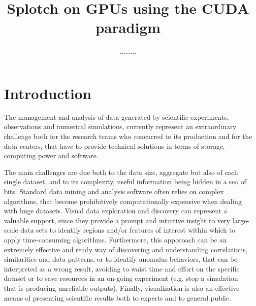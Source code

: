 \documentclass[11pt]{article}
\title{Splotch on GPUs using the CUDA paradigm}
\author{.........}
\begin{document}
\maketitle

\section{Introduction}
\label{sec:intro}

The management and analysis of data generated by scientific experiments, 
observations and numerical simulations, currently represent an extraordinary challenge  
both for the research teams who concurred to its production and for 
the data centers, that have to provide technical solutions in terms of 
storage, computing power and software.

The main challenges are due both to the data size, aggregate but also of each 
single dataset, and to its complexity, useful information being hidden in a sea 
of bits. Standard data mining and analysis software often relies on complex
algorithms, that become prohibitively computationally expensive when dealing with 
huge datasets. Visual data exploration and discovery can represent a valuable
support, since they provide a prompt and intuitive insight to
very large-scale data sets to identify regions and/or features of interest within which
to apply time-consuming algorithms. 
Furthermore, this apporoach can be an extremely effective and ready way of discovering 
and understanding correlations,
similarities and data patterns, or to identify anomalus behaviors, that can be
interpreted as a wrong result, avoiding to waist time and effort on the specific dataset or
to save resources in an on-going experiment (e.g. stop a simulation that is producing 
unreliable outputs). Finally, visualization is also an effective means of presenting
scientific results both to experts and to general public.
\end{document}
